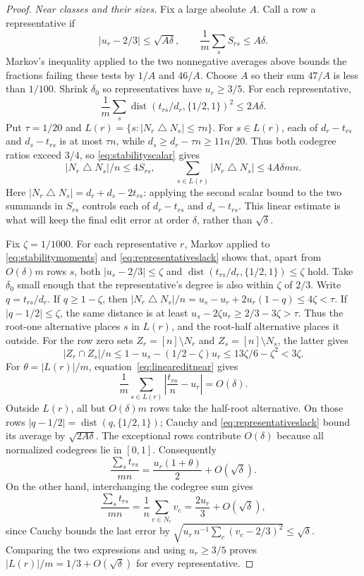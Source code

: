 \documentclass[11pt]{article}
\begin{document}
\begin{proof}
\smallskip\noindent\emph{Near classes and their sizes.}
Fix a large absolute $A$. Call a row a representative if
\[
 |u_r-2/3|\le\sqrt{A\delta},\qquad
 \frac1m\sum_sS_{rs}\le A\delta.
\]
Markov's inequality applied to the two nonnegative averages above bounds
the fractions failing these tests by $1/A$ and $46/A$.
Choose $A$ so their sum $47/A$ is less than $1/100$.
Shrink $\delta_0$ so representatives have $u_r\ge3/5$.
For each representative,
\begin{equation}\label{eq:representativeslack}
 \frac1m\sum_s\operatorname{dist}(t_{rs}/d_r,\{1/2,1\})^2
 \le2A\delta.
\end{equation}
Put $\tau=1/20$ and
$L(r)=\{s:|N_r\mathbin\triangle N_s|\le\tau n\}$.
For $s\in L(r)$, each of $d_r-t_{rs}$ and $d_s-t_{rs}$ is at most
$\tau n$, while $d_s\ge d_r-\tau n\ge11n/20$.
Thus both codegree ratios exceed $3/4$, so
\eqref{eq:stabilityscalar} gives
\begin{equation}\label{eq:lineareditnear}
 |N_r\mathbin\triangle N_s|/n\le4S_{rs},\qquad
 \sum_{s\in L(r)}|N_r\mathbin\triangle N_s|\le4A\delta mn.
\end{equation}
Here $|N_r\mathbin\triangle N_s|=d_r+d_s-2t_{rs}$: applying
the second scalar bound to the two summands in $S_{rs}$ controls each
of $d_r-t_{rs}$ and $d_s-t_{rs}$. This linear estimate is what will
keep the final edit error at order $\delta$, rather than $\sqrt\delta$.

Fix $\zeta=1/1000$. For each representative $r$, Markov applied to
\eqref{eq:stabilitymoments} and \eqref{eq:representativeslack} shows
that, apart from $O(\delta)m$ rows $s$, both
$|u_s-2/3|\le\zeta$ and
$\operatorname{dist}(t_{rs}/d_r,\{1/2,1\})\le\zeta$ hold.
Take $\delta_0$ small enough that the representative's degree is also
within $\zeta$ of $2/3$. Write $q=t_{rs}/d_r$. If $q\ge1-\zeta$, then
$|N_r\mathbin\triangle N_s|/n=u_s-u_r+2u_r(1-q)\le4\zeta<\tau$.
If $|q-1/2|\le\zeta$, the same distance is at least
$u_s-2\zeta u_r\ge2/3-3\zeta>\tau$.
Thus the root-one alternative places $s$ in $L(r)$, and the
root-half alternative places it outside. For the row zero sets
$Z_r=[n]\setminus N_r$ and $Z_s=[n]\setminus N_s$, the latter gives
\[
 |Z_r\cap Z_s|/n\le1-u_s-(1/2-\zeta)u_r
       \le13\zeta/6-\zeta^2<3\zeta.
\]
For $\theta=|L(r)|/m$, equation~\eqref{eq:lineareditnear} gives
\[
 \frac1m\sum_{s\in L(r)}\left|\frac{t_{rs}}n-u_r\right|=O(\delta).
\]
Outside $L(r)$, all but $O(\delta)m$ rows take the half-root alternative.
On those rows $|q-1/2|=\operatorname{dist}(q,\{1/2,1\})$; Cauchy and
\eqref{eq:representativeslack} bound its average by $\sqrt{2A\delta}$.
The exceptional rows contribute $O(\delta)$ because all normalized
codegrees lie in $[0,1]$. Consequently
\[
 \frac{\sum_s t_{rs}}{mn}
 =\frac{u_r(1+\theta)}2+O(\sqrt\delta).
\]
On the other hand, interchanging the codegree sum gives
\[
 \frac{\sum_s t_{rs}}{mn}
 =\frac1n\sum_{c\in N_r}v_c
 =\frac{2u_r}{3}+O(\sqrt\delta),
\]
since Cauchy bounds the last error by
$\sqrt{u_r\,n^{-1}\sum_c(v_c-2/3)^2}\le\sqrt\delta$.
Comparing the two expressions and using $u_r\ge3/5$ proves
$|L(r)|/m=1/3+O(\sqrt\delta)$ for every representative.


\end{proof}
\end{document}
